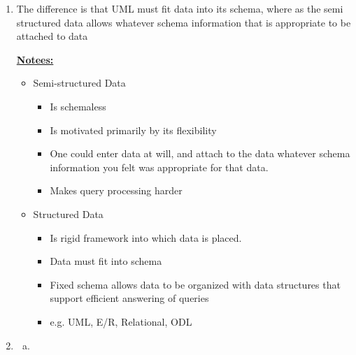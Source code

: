 \documentclass[12pt]{article}
\begin{document}
\begin{enumerate}[1.]
    \item

    The difference is that UML must fit data into its schema, where as the semi
    structured data allows whatever schema information that is appropriate to be attached to data

    \bigskip

    \underline{\textbf{Notees:}}

    \bigskip

    \begin{itemize}
        \item Semi-structured Data
        \begin{itemize}
            \item Is schemaless
            \item Is motivated primarily by its flexibility
            \item One could enter data at will, and attach to the data whatever schema information
            you felt was appropriate for that data.
            \item Makes query processing harder
        \end{itemize}
        \item Structured Data
        \begin{itemize}
            \item Is rigid framework into which data is placed.
            \item Data must fit into schema
            \item Fixed schema allows data to be organized with data structures
            that support efficient answering of queries
            \item e.g. UML, E/R, Relational, ODL
        \end{itemize}
    \end{itemize}

    \item

    \begin{enumerate}[a)]
        \item


\end{enumerate}
\end{enumerate}
\end{document}

